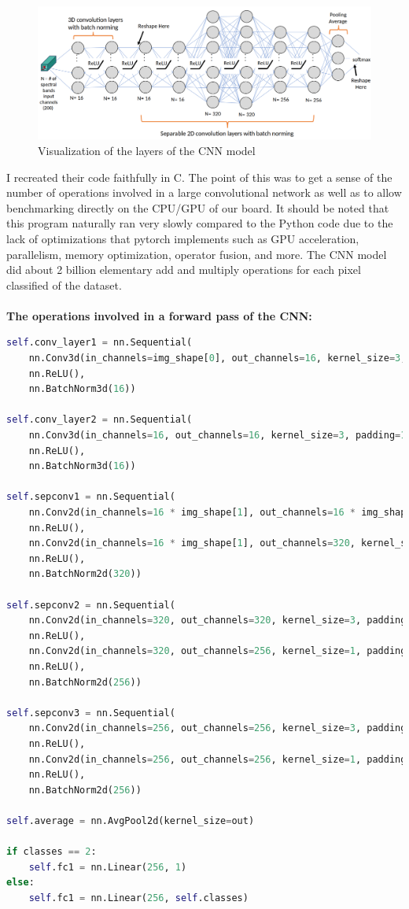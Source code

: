 \documentclass[psamsfonts]{amsart}
\theoremstyle{definition}
\theoremstyle{remark}
\numberwithin{equation}{section}
\begin{document}
\begin{figure}[H]
  \centering
  \includegraphics[scale=0.25]{cnn_arch.png}
  \caption{Visualization of the layers of the CNN model \cite{dirk-presentation}}
\end{figure}

I recreated their code faithfully in C. The point of this was to get a sense of the number of operations involved in a large convolutional network as well as to allow benchmarking directly on the CPU/GPU of our board. It should be noted that this program naturally ran very slowly compared to the Python code due to the lack of optimizations that pytorch implements such as GPU acceleration, parallelism, memory optimization, operator fusion, and more. The CNN model did about 2 billion elementary add and multiply operations for each pixel classified of the dataset.\\\\
\textbf{The operations involved in a forward pass of the CNN:}
\begin{lstlisting}[language=python]
self.conv_layer1 = nn.Sequential(
    nn.Conv3d(in_channels=img_shape[0], out_channels=16, kernel_size=3, padding=1),
    nn.ReLU(),
    nn.BatchNorm3d(16))

self.conv_layer2 = nn.Sequential(
    nn.Conv3d(in_channels=16, out_channels=16, kernel_size=3, padding=1),
    nn.ReLU(),
    nn.BatchNorm3d(16))

self.sepconv1 = nn.Sequential(
    nn.Conv2d(in_channels=16 * img_shape[1], out_channels=16 * img_shape[1], kernel_size=5, padding=2, groups=16 * img_shape[1]),
    nn.ReLU(),
    nn.Conv2d(in_channels=16 * img_shape[1], out_channels=320, kernel_size=1, padding=0),
    nn.ReLU(),
    nn.BatchNorm2d(320))

self.sepconv2 = nn.Sequential(
    nn.Conv2d(in_channels=320, out_channels=320, kernel_size=3, padding=1, stride=stride, groups=320),
    nn.ReLU(),
    nn.Conv2d(in_channels=320, out_channels=256, kernel_size=1, padding=0),
    nn.ReLU(),
    nn.BatchNorm2d(256))

self.sepconv3 = nn.Sequential(
    nn.Conv2d(in_channels=256, out_channels=256, kernel_size=3, padding=1, stride=stride, groups=256),
    nn.ReLU(),
    nn.Conv2d(in_channels=256, out_channels=256, kernel_size=1, padding=0),
    nn.ReLU(),
    nn.BatchNorm2d(256))

self.average = nn.AvgPool2d(kernel_size=out)

if classes == 2:
    self.fc1 = nn.Linear(256, 1)
else:
    self.fc1 = nn.Linear(256, self.classes)
\end{lstlisting}
\end{document}
